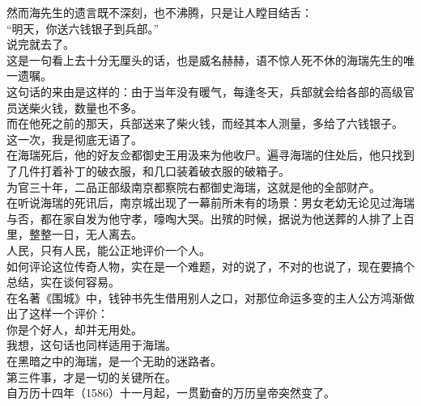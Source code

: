 \begin{multicols}{\theparacolNo}
然而海先生的遗言既不深刻，也不沸腾，只是让人瞠目结舌：\\

“明天，你送六钱银子到兵部。”\\

说完就去了。\\

这是一句看上去十分无厘头的话，也是威名赫赫，语不惊人死不休的海瑞先生的唯一遗嘱。\\

这句话的来由是这样的：由于当年没有暖气，每逢冬天，兵部就会给各部的高级官员送柴火钱，数量也不多。\\

而在他死之前的那天，兵部送来了柴火钱，而经其本人测量，多给了六钱银子。\\

这一次，我是彻底无语了。\\

在海瑞死后，他的好友佥都御史王用汲来为他收尸。遍寻海瑞的住处后，他只找到了几件打着补丁的破衣服，和几口装着破衣服的破箱子。\\

为官三十年，二品正部级南京都察院右都御史海瑞，这就是他的全部财产。\\

在听说海瑞的死讯后，南京城出现了一幕前所未有的场景：男女老幼无论见过海瑞与否，都在家自发为他守孝，嚎啕大哭。出殡的时候，据说为他送葬的人排了上百里，整整一日，无人离去。\\

人民，只有人民，能公正地评价一个人。\\

如何评论这位传奇人物，实在是一个难题，对的说了，不对的也说了，现在要搞个总结，实在谈何容易。\\

在名著《围城》中，钱钟书先生借用别人之口，对那位命运多变的主人公方鸿渐做出了这样一个评价：\\

你是个好人，却并无用处。\\

我想，这句话也同样适用于海瑞。\\

在黑暗之中的海瑞，是一个无助的迷路者。\\

第三件事，才是一切的关键所在。\\

自万历十四年（1586）十一月起，一贯勤奋的万历皇帝突然变了。\\


\end{multicols}
